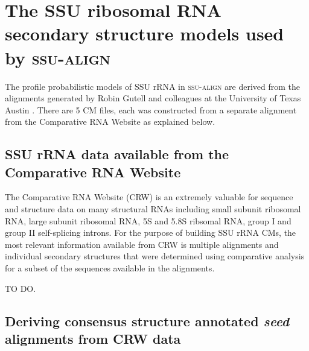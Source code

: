 \section{The SSU ribosomal RNA secondary structure models used by \textsc{ssu-align}}
\label{sect:models}

The profile probabilistic models of SSU rRNA in \textsc{ssu-align} are
derived from the alignments generated by Robin Gutell and colleagues
at the University of Texas Austin \cite{Cannone02}. There are 5 CM
files, each was constructed from a separate alignment from the
Comparative RNA Website as explained below.

\subsection{SSU rRNA data available from the Comparative RNA Website}

The Comparative RNA Website (CRW) is an extremely valuable for
sequence and structure data on many structural RNAs including small
subunit ribosomal RNA, large subunit ribosomal RNA, 5S and 5.8S
ribsomal RNA, group I and group II self-splicing introns. For the
purpose of building SSU rRNA CMs, the most relevant information
available from CRW is multiple alignments and individual secondary
structures that were determined using comparative analysis for a
subset of the sequences available in the alignments. 

TO DO.

\subsection{Deriving consensus structure annotated \emph{seed} alignments from CRW data}


